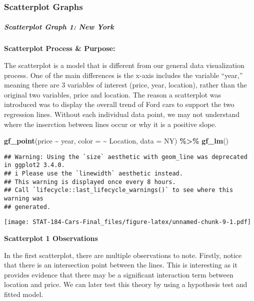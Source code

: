 \documentclass[
]{article}
\newenvironment{Shaded}{\begin{snugshade}}{\end{snugshade}}
\newcommand{\AttributeTok}[1]{\textcolor[rgb]{0.13,0.29,0.53}{#1}}
\newcommand{\FunctionTok}[1]{\textcolor[rgb]{0.13,0.29,0.53}{\textbf{#1}}}
\newcommand{\NormalTok}[1]{#1}
\newcommand{\SpecialCharTok}[1]{\textcolor[rgb]{0.81,0.36,0.00}{\textbf{#1}}}
\begin{document}
\hypertarget{scatterplot-graphs}{%
\subsubsection{\texorpdfstring{\textbf{Scatterplot
Graphs}}{Scatterplot Graphs}}\label{scatterplot-graphs}}

\hypertarget{scatterplot-graph-1-new-york}{%
\subparagraph{Scatterplot Graph 1: New
York}\label{scatterplot-graph-1-new-york}}

\textbf{Scatterplot Process \& Purpose:}

The scatterplot is a model that is different from our general data
visualization process. One of the main differences is the x-axis
includes the variable ``year,'' meaning there are 3 variables of
interest (price, year, location), rather than the original two
variables, price and location. The reason a scatterplot was introduced
was to display the overall trend of Ford cars to support the two
regression lines. Without each individual data point, we may not
understand where the inserction between lines occur or why it is a
positive slope.

\begin{Shaded}
\begin{Highlighting}[]
\FunctionTok{gf\_point}\NormalTok{(price }\SpecialCharTok{\textasciitilde{}}\NormalTok{ year, }\AttributeTok{color =} \SpecialCharTok{\textasciitilde{}}\NormalTok{ Location, }\AttributeTok{data =}\NormalTok{ NY) }\SpecialCharTok{\%\textgreater{}\%}
  \FunctionTok{gf\_lm}\NormalTok{()}
\end{Highlighting}
\end{Shaded}

\begin{verbatim}
## Warning: Using the `size` aesthetic with geom_line was deprecated in ggplot2 3.4.0.
## i Please use the `linewidth` aesthetic instead.
## This warning is displayed once every 8 hours.
## Call `lifecycle::last_lifecycle_warnings()` to see where this warning was
## generated.
\end{verbatim}

\texttt{[image: STAT-184-Cars-Final\_files/figure-latex/unnamed-chunk-9-1.pdf]}

\textbf{Scatterplot 1 Observations}

In the first scatterplot, there are multiple observations to note.
Firstly, notice that there is an intersection point between the lines.
This is interesting as it provides evidence that there may be a
significant interaction term between location and price. We can later
test this theory by using a hypothesis test and fitted model.
\end{document}
